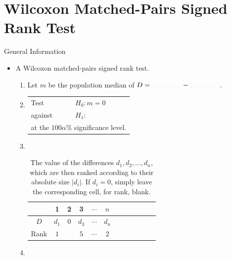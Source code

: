 \documentclass[../Notes.tex]{subfiles}
\begin{document}
\section{Wilcoxon Matched-Pairs Signed Rank Test}
\begin{stbox}{General Information}
  \begin{itemize}
    \item A Wilcoxon matched-pairs signed rank test. 
    \begin{enumerate}
      \item Let \(m\) be the population median of \(D=\rule{1.5cm}{0.01mm}-\rule{1.5cm}{0.01mm}\).
      \item 
      \begin{tabular}{|ll|}
        \hline
        Test & \(H_0\colon m=0\)\\
        against &\(H_1\colon\) 
        \begin{enumerate*}[itemjoin={\quad}]
          \item \(m<\highlight[yellow]{0}\),
          \item \(m\neq \highlight[yellow]{0}\),\quad or
          \item \(m>\highlight[yellow]{0}\),
        \end{enumerate*}\\
        \multicolumn{2}{|l|}{at the \(100\alpha\%\) significance level.}\\
        \hline
      \end{tabular}
      \item ~
      \begin{table}[H]
        \centering
        \begin{tabular}{|Sc|Sc|Sc|Sc|Sc|Sc|}
           & 1 & 2 & 3 & \(\cdots\) & \(n\)\\
          \hline 
          \(D\) & \(d_1\) & \(0\) & \(d_3\) & \(\cdots\) & \(d_n\)\\
          \hline
          Rank & \(1\) &  & \(5\) & \(\cdots\) & \(2\)\\
          \hline
        \end{tabular}
        \caption{The value of the differences \(d_1,d_2,\dots,d_n\), which are then ranked according to their absolute size \(\lvert d_i \rvert\). If \(d_i=0\), simply leave the corresponding cell, for rank, blank.}
        \label{table:wilcoxon-working-table}
      \end{table}
      \item
      \begin{itemize}[label=\(\circ\)]

\end{itemize}
\end{enumerate}
\end{itemize}
\end{stbox}
\end{document}
